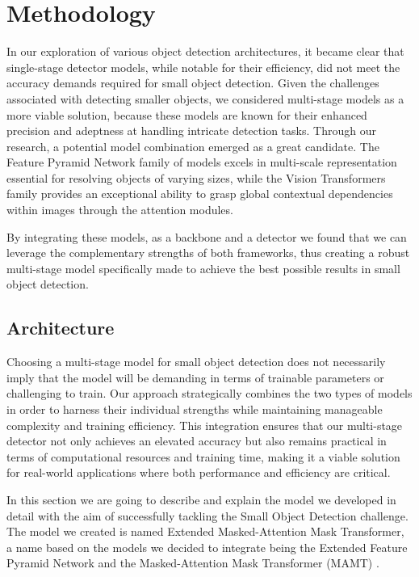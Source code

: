 \chapter{Methodology}

In our exploration of various object detection architectures, it became clear that single-stage detector models, while notable for their efficiency, did not 
meet the accuracy demands required for small object detection. Given the challenges associated with detecting smaller objects, we considered multi-stage models
as a more viable solution, because these models are known for their enhanced precision and adeptness at handling intricate detection tasks. Through our research, 
a potential model combination emerged as a great candidate. The Feature Pyramid Network family of models excels in multi-scale representation essential for 
resolving objects of varying sizes, while the Vision Transformers family provides an exceptional ability to grasp global contextual dependencies within images
through the attention modules. 

By integrating these models, as a backbone and a detector we found that we can leverage the complementary strengths of both frameworks, thus creating a 
robust multi-stage model specifically made to achieve the best possible results in small object detection.

\section{Architecture}

Choosing a multi-stage model for small object detection does not necessarily imply that the model will be demanding in terms of trainable parameters or challenging 
to train. Our approach strategically combines the two types of models in order to harness their individual strengths while maintaining manageable complexity 
and training efficiency. This integration ensures that our multi-stage detector not only achieves an elevated accuracy but also remains practical in terms of 
computational resources and training time, making it a viable solution for real-world applications where both performance and efficiency are critical.

In this section we are going to describe and explain the model we developed in detail with the aim of successfully tackling the Small Object Detection challenge. 
The model we created is named Extended Masked-Attention Mask Transformer, a name based on the models we decided to integrate being the Extended Feature Pyramid 
Network \cite{efpn} and the Masked-Attention Mask Transformer (MAMT) \cite{mamt2}.

